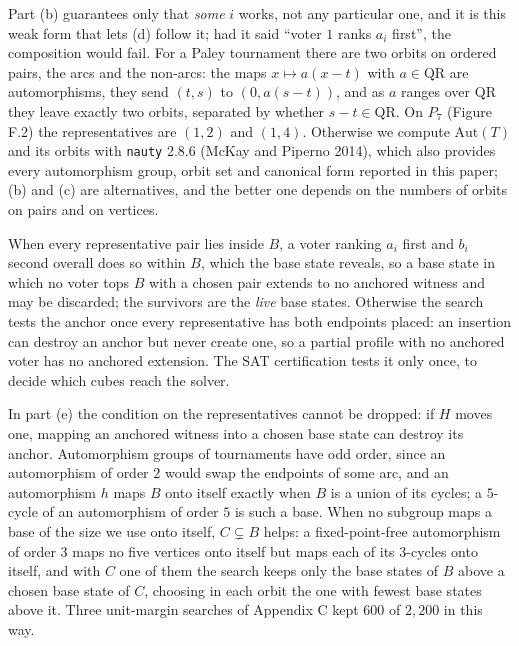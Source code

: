 \documentclass[
]{article}
\begin{document}
Part (b) guarantees only that \emph{some} \(i\) works, not any
particular one, and it is this weak form that lets (d) follow it; had it
said ``voter \(1\) ranks \(a_i\) first'', the composition would fail.
For a Paley tournament there are two orbits on ordered pairs, the arcs
and the non-arcs: the maps \(x \mapsto a(x-t)\) with
\(a \in \mathrm{QR}\) are automorphisms, they send \((t,s)\) to
\((0, a(s-t))\), and as \(a\) ranges over \(\mathrm{QR}\) they leave
exactly two orbits, separated by whether \(s - t \in \mathrm{QR}\). On
\(P_7\) (Figure F.2) the representatives are \((1,2)\) and \((1,4)\).
Otherwise we compute \(\mathrm{Aut}(T)\) and its orbits with
\texttt{nauty} 2.8.6 (McKay and Piperno 2014), which also provides every
automorphism group, orbit set and canonical form reported in this paper;
(b) and (c) are alternatives, and the better one depends on the numbers
of orbits on pairs and on vertices.

When every representative pair lies inside \(B\), a voter ranking
\(a_i\) first and \(b_i\) second overall does so within \(B\), which the
base state reveals, so a base state in which no voter tops \(B\) with a
chosen pair extends to no anchored witness and may be discarded; the
survivors are the \emph{live} base states. Otherwise the search tests
the anchor once every representative has both endpoints placed: an
insertion can destroy an anchor but never create one, so a partial
profile with no anchored voter has no anchored extension. The SAT
certification tests it only once, to decide which cubes reach the
solver.

In part (e) the condition on the representatives cannot be dropped: if
\(H\) moves one, mapping an anchored witness into a chosen base state
can destroy its anchor. Automorphism groups of tournaments have odd
order, since an automorphism of order \(2\) would swap the endpoints of
some arc, and an automorphism \(h\) maps \(B\) onto itself exactly when
\(B\) is a union of its cycles; a \(5\)-cycle of an automorphism of
order \(5\) is such a base. When no subgroup maps a base of the size we
use onto itself, \(C \subsetneq B\) helps: a fixed-point-free
automorphism of order \(3\) maps no five vertices onto itself but maps
each of its \(3\)-cycles onto itself, and with \(C\) one of them the
search keeps only the base states of \(B\) above a chosen base state of
\(C\), choosing in each orbit the one with fewest base states above it.
Three unit-margin searches of Appendix C kept \(600\) of \(2{,}200\) in
this way.
\end{document}
